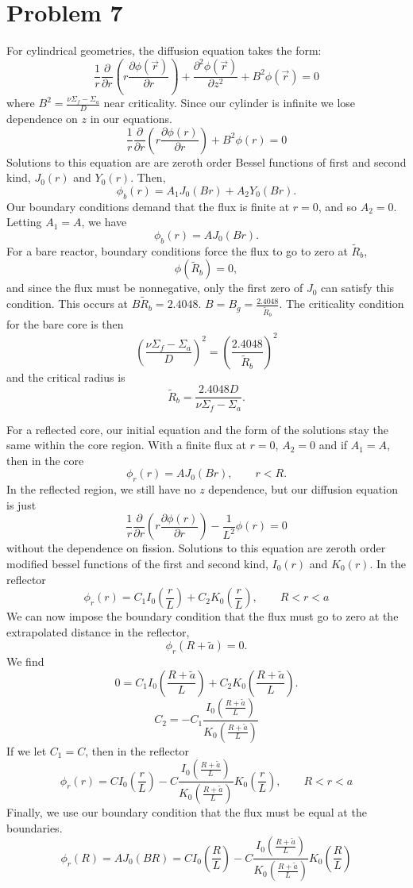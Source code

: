 \documentclass{article}
\newcommand{\p}{\partial}
\newcommand{\Xs}{\Sigma}
\newcommand{\pos}{\vec{r}}
\begin{document}

\section*{Problem 7}

For cylindrical geometries, the diffusion equation takes the form:
$$ \frac{1}{r}\frac{\p}{\p r}\left(r \frac{\p \phi(\pos)}{\p r}\right) + \frac{\p^2 \phi(\pos)}{\p z^2} + B^2\phi(\pos) = 0$$
where $B^2 = \frac{\nu\Xs_f - \Xs_a}{D} $ near criticality. 
Since our cylinder is infinite we lose dependence on $z$ in our equations.
$$ \frac{1}{r}\frac{\p}{\p r}\left(r \frac{\p \phi(r)}{\p r}\right) + B^2\phi(r) = 0$$
Solutions to this equation are are zeroth order Bessel functions of first and second kind, $J_0(r)$ and $Y_0(r)$. 
Then,
$$ \phi_b(r) = A_1 J_0(B r) + A_2 Y_0(B r) .$$
Our boundary conditions demand that the flux is finite at $r = 0$, and so $A_2 = 0$. 
Letting $A_1 = A$, we have
$$ \phi_b(r) = A J_0(B r) .$$
For a bare reactor, boundary conditions force the flux to go to zero at $\tilde{R}_b$,
$$ \phi(\tilde{R}_b) = 0 ,$$
and since the flux must be nonnegative, only the first zero of $J_0$ can satisfy this condition. This occurs at $B \tilde{R}_b = 2.4048$. $B = B_g = \frac{2.4048}{\tilde{R}_b}$. The criticality condition for the bare core is then 
$$ \left(\frac{\nu\Xs_f - \Xs_a}{D}\right)^2 = \left(\frac{2.4048}{\tilde{R}_b}\right)^2 $$
and the critical radius is
$$ \tilde{R}_b = \frac{2.4048 D}{\nu\Xs_f - \Xs_a} .$$

For a reflected core, our initial equation and the form of the solutions stay the same within the core region. 
With a finite flux at $r=0$, $A_2 = 0$ and if $A_1 = A$, then in the core 
$$ \phi_{r}(r) = A J_0(B r), \qquad r<R.$$
In the reflected region, we still have no $z$ dependence, but our diffusion equation is just
$$ \frac{1}{r}\frac{\p}{\p r}\left(r \frac{\p \phi(r)}{\p r}\right) - \frac{1}{L^2}\phi(r) = 0$$
without the dependence on fission. Solutions to this equation are zeroth order modified bessel functions of the first and second kind, $I_0(r)$ and $K_0(r)$.
In the reflector
$$ \phi_{r}(r) = C_1 I_0(\frac{r}{L}) + C_2 K_0(\frac{r}{L}), \qquad R<r<a$$
We can now impose the boundary condition that the flux must go to zero at the extrapolated distance in the reflector,
$$ \phi_{r}(R+\tilde{a}) = 0 .$$
We find
$$ 0 = C_1 I_0(\frac{R+\tilde{a}}{L}) + C_2 K_0(\frac{R+\tilde{a}}{L}) .$$
$$ C_2 = -C_1 \frac{I_0(\frac{R+\tilde{a}}{L})}{K_0(\frac{R+\tilde{a}}{L})} $$
If we let $C_1 = C$, then in the reflector
$$ \phi_{r}(r) = C I_0(\frac{r}{L}) - C \frac{I_0(\frac{R+\tilde{a}}{L})}{K_0(\frac{R+\tilde{a}}{L})} K_0(\frac{r}{L}), \qquad R<r<a$$
Finally, we use our boundary condition that the flux must be equal at the boundaries.
$$ \phi_{r}(R) = A J_0(B R) = C I_0(\frac{R}{L}) - C \frac{I_0(\frac{R+\tilde{a}}{L})}{K_0(\frac{R+\tilde{a}}{L})} K_0(\frac{R}{L}) $$
\end{document}
